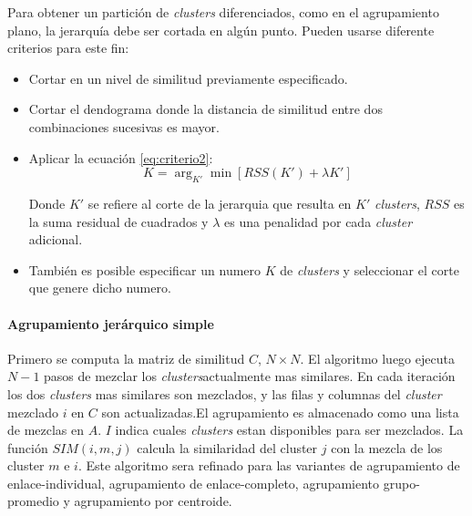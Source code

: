       Para obtener un partición de \textit{clusters} diferenciados, como en el agrupamiento plano, la jerarquía debe ser cortada en algún punto. Pueden usarse diferente criterios para este fin: 

      \begin{itemize}
        \item Cortar en un nivel de similitud previamente especificado.
        \item Cortar el dendograma donde la distancia de similitud entre dos combinaciones sucesivas es mayor.
        \item  Aplicar la ecuación \ref{eq:criterio2}: 
            \begin{equation}\label{eq:criterio2.2}
               K = \arg_{K'} \min{[RSS(K')+\lambda K']}
            \end{equation} 

            Donde $K'$ se refiere al corte de la jerarquia que resulta en $K'$ \textit{clusters}, $RSS$ es la suma residual de cuadrados y $\lambda$ es una penalidad por cada \textit{cluster} adicional.
         \item También es posible especificar un numero $K$ de \textit{clusters} y seleccionar el corte que genere dicho numero.

      \end{itemize}

   


    \paragraph{Agrupamiento jerárquico simple}
      Primero se computa la matriz de similitud $C$, $N\times N$. El algoritmo luego ejecuta $N-1$ pasos de mezclar los \textit{clusters}actualmente mas similares. En cada iteración los dos \textit{clusters} mas similares son mezclados, y las filas y columnas del \textit{cluster} mezclado $i$ en $C$ son actualizadas.El agrupamiento es almacenado como una lista de mezclas en $A$. $I$ indica cuales \textit{clusters} estan disponibles para ser mezclados. La función $SIM(i,m,j)$ calcula la similaridad del cluster $j$ con la mezcla de los cluster $m$ e $i$. Este algoritmo sera refinado para las variantes de agrupamiento de enlace-individual, agrupamiento de enlace-completo, agrupamiento grupo-promedio y agrupamiento por centroide.\cite{informationretrieval}

